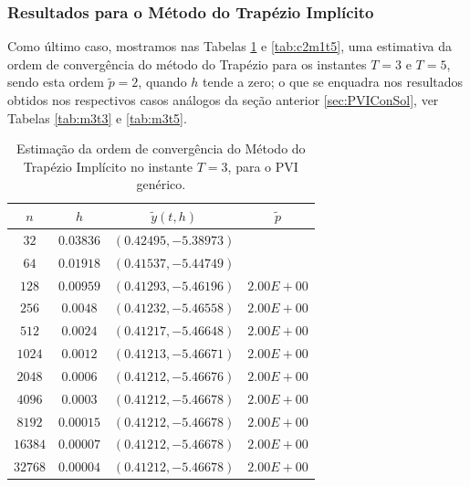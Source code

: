 \documentclass[twocolumn,amsmath,amssymb,floatfix]{revtex4}
\begin{document}
\subsubsection{Resultados para o Método do Trapézio Implícito}
Como último caso, mostramos nas Tabelas \ref{tab:c2m3t3} e \ref{tab:c2m1t5}, uma estimativa da ordem de convergência do método do Trapézio para os instantes $T=3$ e $T=5$, sendo esta ordem $\tilde{p}=2$, quando $h$ tende a zero; o que se enquadra nos resultados obtidos nos respectivos casos análogos da seção anterior \ref{sec:PVIConSol}, ver Tabelas \ref{tab:m3t3} e \ref{tab:m3t5}.
\begin{table}[H]
 \centering
 \begin{tabular}{ c|c|c|c }
  \hline
  \hline
  $n$  & $h$  & $\tilde{y}(t,h)$ & $\tilde{p}$ \\
  \hline
  \hline
$32$&$0.03836$&	$   (   0.42495,   -5.38973)$ &	$ $ \\
\hline
$64$&$0.01918$&$   (   0.41537,   -5.44749)$&$ $\\
\hline
$128$&$0.00959	 $&$   (   0.41293,   -5.46196)	$&$2.00E+00$\\
\hline
$256$&$0.0048	 $&$  (   0.41232,   -5.46558)	$&$2.00E+00$\\
\hline
$512$&$0.0024	 $&$   (   0.41217,   -5.46648)	$&$2.00E+00$\\
\hline
$1024$&$0.0012	 $&$   (   0.41213,   -5.46671)	$&$2.00E+00$\\
\hline
$2048$&$0.0006	 $&$   (   0.41212,   -5.46676)	$&$2.00E+00$\\
\hline
$4096$&$0.0003	 $&$   (   0.41212,   -5.46678)	$&$2.00E+00$\\
\hline
$8192$&$0.00015	 $&$   (   0.41212,   -5.46678)	$&$2.00E+00$\\
\hline
$16384$&$0.00007	 $&$   (   0.41212,   -5.46678)	$&$2.00E+00$\\
\hline
$32768$&$0.00004	 $&$  (   0.41212,   -5.46678)	$&$2.00E+00$\\
  \hline
  \hline
 \end{tabular}
   \caption{Estimação da ordem de convergência do Método do Trapézio Implícito no instante $T=3$, para o PVI genérico.} \label{tab:c2m3t3}
\end{table}
\end{document}
